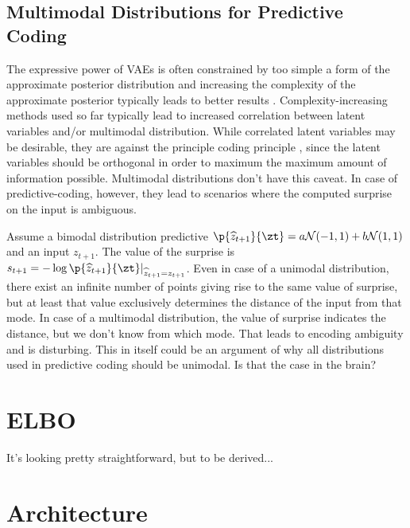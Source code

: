\documentclass[]{article}
\begin{document}
	\subsection{Multimodal Distributions for Predictive Coding}
	
	The expressive power of VAEs is often constrained by too simple a form of the approximate posterior distribution and increasing the complexity of the approximate posterior typically leads to better results . Complexity-increasing methods used so far typically lead to increased correlation between latent variables and/or multimodal distribution. While correlated latent variables may be desirable, they are against the principle coding principle , since the latent variables should be orthogonal in order to maximum the maximum amount of information possible. Multimodal distributions don't have this caveat. In case of predictive-coding, however, they lead to scenarios where the computed surprise on the input is ambiguous. 
	
	Assume a bimodal distribution predictive $\p{\widehat{z}_{t+1}}{\zt} = a \gauss{-1, 1} + b \gauss{1, 1}$ and an input $z_{t+1}$. The value of the surprise is $s_{t+1} = -\log \p{\widehat{z}_{t+1}}{\zt}\lvert_{\widehat{z}_{t+1} = z_{t+1}}$. Even in case of a unimodal distribution, there exist an infinite number of points giving rise to the same value of surprise, but at least that value exclusively determines the distance of the input from that mode. In case of a multimodal distribution, the value of surprise indicates the distance, but we don't know from which mode. That leads to encoding ambiguity and is disturbing. This in itself could be an argument of why all distributions used in predictive coding should be unimodal. Is that the case in the brain?
	
\section{ELBO}
	
	It's looking pretty straightforward, but to be derived...
	
\section{Architecture}
\end{document}
